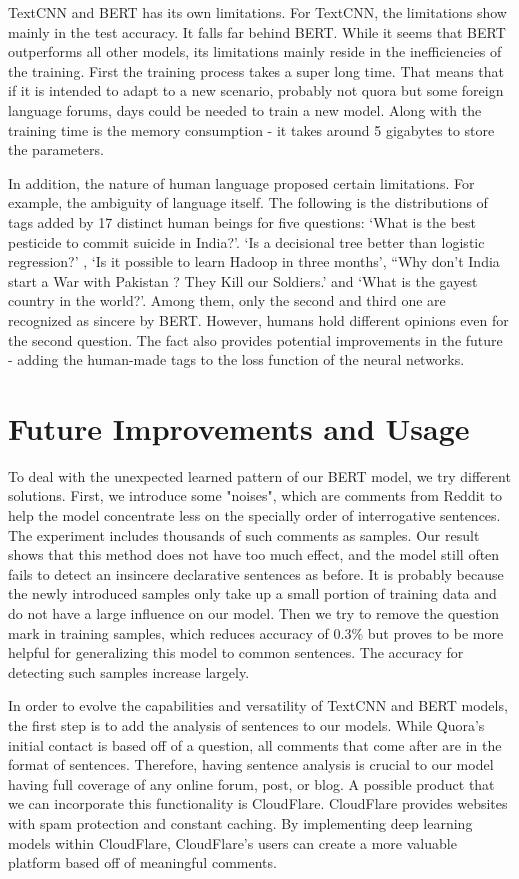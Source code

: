 \documentclass{article}
\begin{document}
TextCNN and BERT has its own limitations. For TextCNN, the limitations show mainly in the test accuracy. It falls far behind BERT. While it seems that BERT outperforms all other models, its limitations mainly reside in the inefficiencies of the training. First the training process takes a super long time. That means that if it is intended to adapt to a new scenario, probably not quora but some foreign language forums, days could be needed to train a new model.  Along with the training time is the memory consumption - it takes around 5 gigabytes to store the parameters.

In addition, the nature of human language proposed certain limitations. For example, the ambiguity of language itself. The following is the distributions of tags added by 17 distinct human beings for five questions: ‘What is the best pesticide to commit suicide in India?’. ‘Is a decisional tree better than logistic regression?’ , ‘Is it possible to learn Hadoop in three months’, “Why don't India start a War with Pakistan ? They Kill our Soldiers.’ and  ‘What is the gayest country in the world?’. Among them, only the second and third one are recognized as sincere by BERT. However, humans hold different opinions even for the second question. The fact also provides potential improvements in the future - adding the human-made tags to the loss function of the neural networks. 



\section{Future Improvements and Usage}
To deal with the unexpected learned pattern of our BERT model, we try different solutions. First, we introduce some "noises", which are comments from Reddit to help the model concentrate less on the specially order of interrogative sentences. The experiment includes thousands of such comments
as samples. Our result shows that this method does not have too much effect, and the model still often fails to detect an insincere declarative sentences as before. It is probably because the newly introduced samples only take up a small portion of training data and do not have a large influence on our model. Then we try to remove the question mark in training samples, which reduces accuracy of 0.3\% but proves to be more helpful for generalizing this model to common sentences. The accuracy for detecting such samples increase largely.

In order to evolve the capabilities and versatility of TextCNN and BERT models, the first step is to add the analysis of sentences to our models. While Quora’s initial contact is based off of a question, all comments that come after are in the format of sentences. Therefore, having sentence analysis is crucial to our model having full coverage of any online forum, post, or blog. A possible product that we can incorporate this functionality is CloudFlare. CloudFlare provides websites with spam protection and constant caching. By implementing deep learning models within CloudFlare, CloudFlare’s users can create a more valuable platform based off of meaningful comments. 
\end{document}
